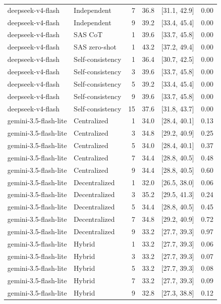 \begin{tabular}{@{}llrrrr@{}}
deepseek-v4-flash & Independent & 7 & 36.8 & [31.1, 42.9] & 0.00 \\
deepseek-v4-flash & Independent & 9 & 39.2 & [33.4, 45.4] & 0.00 \\
deepseek-v4-flash & SAS CoT & 1 & 39.6 & [33.7, 45.8] & 0.00 \\
deepseek-v4-flash & SAS zero-shot & 1 & 43.2 & [37.2, 49.4] & 0.00 \\
deepseek-v4-flash & Self-consistency & 1 & 36.4 & [30.7, 42.5] & 0.00 \\
deepseek-v4-flash & Self-consistency & 3 & 39.6 & [33.7, 45.8] & 0.00 \\
deepseek-v4-flash & Self-consistency & 5 & 39.2 & [33.4, 45.4] & 0.00 \\
deepseek-v4-flash & Self-consistency & 9 & 39.6 & [33.7, 45.8] & 0.00 \\
deepseek-v4-flash & Self-consistency & 15 & 37.6 & [31.8, 43.7] & 0.00 \\
gemini-3.5-flash-lite & Centralized & 1 & 34.0 & [28.4, 40.1] & 0.13 \\
gemini-3.5-flash-lite & Centralized & 3 & 34.8 & [29.2, 40.9] & 0.25 \\
gemini-3.5-flash-lite & Centralized & 5 & 34.0 & [28.4, 40.1] & 0.37 \\
gemini-3.5-flash-lite & Centralized & 7 & 34.4 & [28.8, 40.5] & 0.48 \\
gemini-3.5-flash-lite & Centralized & 9 & 34.4 & [28.8, 40.5] & 0.60 \\
gemini-3.5-flash-lite & Decentralized & 1 & 32.0 & [26.5, 38.0] & 0.06 \\
gemini-3.5-flash-lite & Decentralized & 3 & 35.2 & [29.5, 41.3] & 0.24 \\
gemini-3.5-flash-lite & Decentralized & 5 & 34.4 & [28.8, 40.5] & 0.45 \\
gemini-3.5-flash-lite & Decentralized & 7 & 34.8 & [29.2, 40.9] & 0.72 \\
gemini-3.5-flash-lite & Decentralized & 9 & 33.2 & [27.7, 39.3] & 0.97 \\
gemini-3.5-flash-lite & Hybrid & 1 & 33.2 & [27.7, 39.3] & 0.06 \\
gemini-3.5-flash-lite & Hybrid & 3 & 33.2 & [27.7, 39.3] & 0.07 \\
gemini-3.5-flash-lite & Hybrid & 5 & 33.2 & [27.7, 39.3] & 0.08 \\
gemini-3.5-flash-lite & Hybrid & 7 & 33.2 & [27.7, 39.3] & 0.09 \\
gemini-3.5-flash-lite & Hybrid & 9 & 32.8 & [27.3, 38.8] & 0.12 \\

\end{tabular}
